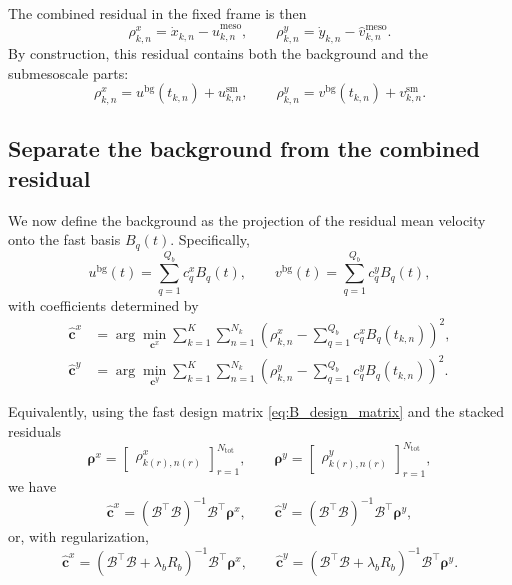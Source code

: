 The combined residual in the fixed frame is then
\begin{equation}
\rho^x_{k,n}=\dot{x}_{k,n}-\hat{u}^{\mathrm{meso}}_{k,n},
\qquad
\rho^y_{k,n}=\dot{y}_{k,n}-\hat{v}^{\mathrm{meso}}_{k,n}.
\label{eq:rho_fixed_residual}
\end{equation}
By construction, this residual contains both the background and the submesoscale parts:
\begin{equation}
\rho^x_{k,n}=u^{\mathrm{bg}}(t_{k,n})+u^{\mathrm{sm}}_{k,n},
\qquad
\rho^y_{k,n}=v^{\mathrm{bg}}(t_{k,n})+v^{\mathrm{sm}}_{k,n}.
\label{eq:rho_decomposition}
\end{equation}

\subsection{Separate the background from the combined residual}

We now define the background as the projection of the residual mean velocity onto the fast
basis $B_q(t)$. Specifically,
\begin{equation}
u^{\mathrm{bg}}(t)=\sum_{q=1}^{Q_b} c^x_q B_q(t),
\qquad
v^{\mathrm{bg}}(t)=\sum_{q=1}^{Q_b} c^y_q B_q(t),
\label{eq:bg_fast_rep}
\end{equation}
with coefficients determined by
\begin{align}
\hat{\mathbf{c}}^x
&=
\arg\min_{\mathbf{c}^x}
\sum_{k=1}^{K}\sum_{n=1}^{N_k}
\left(
\rho^x_{k,n}-\sum_{q=1}^{Q_b} c^x_q B_q(t_{k,n})
\right)^2,
\label{eq:bg_proj_x}
\\
\hat{\mathbf{c}}^y
&=
\arg\min_{\mathbf{c}^y}
\sum_{k=1}^{K}\sum_{n=1}^{N_k}
\left(
\rho^y_{k,n}-\sum_{q=1}^{Q_b} c^y_q B_q(t_{k,n})
\right)^2.
\label{eq:bg_proj_y}
\end{align}

Equivalently, using the fast design matrix \eqref{eq:B_design_matrix} and the stacked
residuals
\begin{equation}
\boldsymbol{\rho}^x=
\begin{bmatrix}
\rho^x_{k(r),n(r)}
\end{bmatrix}_{r=1}^{N_{\mathrm{tot}}},
\qquad
\boldsymbol{\rho}^y=
\begin{bmatrix}
\rho^y_{k(r),n(r)}
\end{bmatrix}_{r=1}^{N_{\mathrm{tot}}},
\end{equation}
we have
\begin{equation}
\hat{\mathbf{c}}^x=(\mathcal{B}^\top\mathcal{B})^{-1}\mathcal{B}^\top\boldsymbol{\rho}^x,
\qquad
\hat{\mathbf{c}}^y=(\mathcal{B}^\top\mathcal{B})^{-1}\mathcal{B}^\top\boldsymbol{\rho}^y,
\label{eq:bg_proj_closed_form}
\end{equation}
or, with regularization,
\begin{equation}
\hat{\mathbf{c}}^x=(\mathcal{B}^\top\mathcal{B}+\lambda_b R_b)^{-1}\mathcal{B}^\top\boldsymbol{\rho}^x,
\qquad
\hat{\mathbf{c}}^y=(\mathcal{B}^\top\mathcal{B}+\lambda_b R_b)^{-1}\mathcal{B}^\top\boldsymbol{\rho}^y.
\end{equation}


